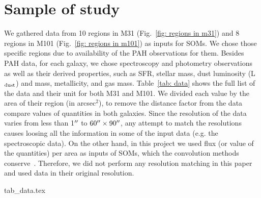
\section{Sample of study}
\label{Sec: data_SOMN}

We gathered data from 10 regions in M31 (Fig.~\ref{fig: regions in m31}) and 8 regions in M101 (Fig.~\ref{fig: regions in m101}) as inputs for SOMs.
We chose those specific regions due to availability of the PAH observations for them.
Besides PAH data, for each galaxy, we chose spectroscopy and photometry observations as well as their derived properties, such as SFR, stellar mass, dust luminosity (L$_{\rm dust}$) and mass, metallicity, and gas mass.
Table~\ref{tab: data} shows the full list of the data and their unit for both M31 and M101.
We divided each value by the area of their region (in arcsec$^2$), to remove the distance factor from the data compare values of quantities in both galaxies.
Since the resolution of the data varies from less than 1$\hbox{$^{\prime\prime}$}$ to $60\hbox{$^{\prime\prime}$} \times 90 \hbox{$^{\prime\prime}$}$, any attempt to match the resolutions causes loosing all the information in some of the input data (e.g. the spectroscopic data).
On the other hand, in this project we used flux (or value of the quantities) per area as inputs of SOMs, which the convolution methods conserve~\citep{Aniano12}.
Therefore, we did not perform any resolution matching in this paper and used data in their original resolution.


{tab_data.tex}


